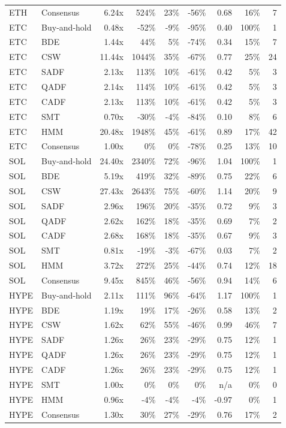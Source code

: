 \documentclass[11pt]{article}
\begin{document}
\begin{longtable}{@{}llrrrrrrr@{}}
ETH & Consensus & 6.24x & 524\% & 23\% & -56\% & 0.68 & 16\% & 7 \\
ETC & Buy-and-hold & 0.48x & -52\% & -9\% & -95\% & 0.40 & 100\% & 1 \\
ETC & BDE & 1.44x & 44\% & 5\% & -74\% & 0.34 & 15\% & 7 \\
ETC & CSW & 11.44x & 1044\% & 35\% & -67\% & 0.77 & 25\% & 24 \\
ETC & SADF & 2.13x & 113\% & 10\% & -61\% & 0.42 & 5\% & 3 \\
ETC & QADF & 2.14x & 114\% & 10\% & -61\% & 0.42 & 5\% & 3 \\
ETC & CADF & 2.13x & 113\% & 10\% & -61\% & 0.42 & 5\% & 3 \\
ETC & SMT & 0.70x & -30\% & -4\% & -84\% & 0.10 & 8\% & 6 \\
ETC & HMM & 20.48x & 1948\% & 45\% & -61\% & 0.89 & 17\% & 42 \\
ETC & Consensus & 1.00x & 0\% & 0\% & -78\% & 0.25 & 13\% & 10 \\
SOL & Buy-and-hold & 24.40x & 2340\% & 72\% & -96\% & 1.04 & 100\% & 1 \\
SOL & BDE & 5.19x & 419\% & 32\% & -89\% & 0.75 & 22\% & 6 \\
SOL & CSW & 27.43x & 2643\% & 75\% & -60\% & 1.14 & 20\% & 9 \\
SOL & SADF & 2.96x & 196\% & 20\% & -35\% & 0.72 & 9\% & 3 \\
SOL & QADF & 2.62x & 162\% & 18\% & -35\% & 0.69 & 7\% & 2 \\
SOL & CADF & 2.68x & 168\% & 18\% & -35\% & 0.67 & 9\% & 3 \\
SOL & SMT & 0.81x & -19\% & -3\% & -67\% & 0.03 & 7\% & 2 \\
SOL & HMM & 3.72x & 272\% & 25\% & -44\% & 0.74 & 12\% & 18 \\
SOL & Consensus & 9.45x & 845\% & 46\% & -56\% & 0.94 & 14\% & 6 \\
HYPE & Buy-and-hold & 2.11x & 111\% & 96\% & -64\% & 1.17 & 100\% & 1 \\
HYPE & BDE & 1.19x & 19\% & 17\% & -26\% & 0.58 & 13\% & 2 \\
HYPE & CSW & 1.62x & 62\% & 55\% & -46\% & 0.99 & 46\% & 7 \\
HYPE & SADF & 1.26x & 26\% & 23\% & -29\% & 0.75 & 12\% & 1 \\
HYPE & QADF & 1.26x & 26\% & 23\% & -29\% & 0.75 & 12\% & 1 \\
HYPE & CADF & 1.26x & 26\% & 23\% & -29\% & 0.75 & 12\% & 1 \\
HYPE & SMT & 1.00x & 0\% & 0\% & 0\% & n/a & 0\% & 0 \\
HYPE & HMM & 0.96x & -4\% & -4\% & -4\% & -0.97 & 0\% & 1 \\
HYPE & Consensus & 1.30x & 30\% & 27\% & -29\% & 0.76 & 17\% & 2 \\
\bottomrule
\end{longtable}
\end{document}
